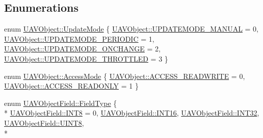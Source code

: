 \subsection*{Enumerations}
\begin{DoxyCompactItemize}
\item 
enum \hyperlink{group___u_a_v_objects_plugin_ga08c0580992fcd51c2b44734e2d24cac6}{U\-A\-V\-Object\-::\-Update\-Mode} \{ \hyperlink{group___u_a_v_objects_plugin_gga08c0580992fcd51c2b44734e2d24cac6a7e761571cc6ee4432fa664f23fcb7032}{U\-A\-V\-Object\-::\-U\-P\-D\-A\-T\-E\-M\-O\-D\-E\-\_\-\-M\-A\-N\-U\-A\-L} = 0, 
\hyperlink{group___u_a_v_objects_plugin_gga08c0580992fcd51c2b44734e2d24cac6a6057e8a8af67f00940fad6f62499b843}{U\-A\-V\-Object\-::\-U\-P\-D\-A\-T\-E\-M\-O\-D\-E\-\_\-\-P\-E\-R\-I\-O\-D\-I\-C} = 1, 
\hyperlink{group___u_a_v_objects_plugin_gga08c0580992fcd51c2b44734e2d24cac6a118268aa016a1f371149d6180bd9a366}{U\-A\-V\-Object\-::\-U\-P\-D\-A\-T\-E\-M\-O\-D\-E\-\_\-\-O\-N\-C\-H\-A\-N\-G\-E} = 2, 
\hyperlink{group___u_a_v_objects_plugin_gga08c0580992fcd51c2b44734e2d24cac6aea4380a186f544bd364259d2e436fb75}{U\-A\-V\-Object\-::\-U\-P\-D\-A\-T\-E\-M\-O\-D\-E\-\_\-\-T\-H\-R\-O\-T\-T\-L\-E\-D} = 3
 \}
\item 
enum \hyperlink{group___u_a_v_objects_plugin_ga80357a2f38fa4be23200de86614c3d77}{U\-A\-V\-Object\-::\-Access\-Mode} \{ \hyperlink{group___u_a_v_objects_plugin_gga80357a2f38fa4be23200de86614c3d77ad710c074e7e275da805bf900c9917d47}{U\-A\-V\-Object\-::\-A\-C\-C\-E\-S\-S\-\_\-\-R\-E\-A\-D\-W\-R\-I\-T\-E} = 0, 
\hyperlink{group___u_a_v_objects_plugin_gga80357a2f38fa4be23200de86614c3d77a97e59f527995175cc60e103001470e49}{U\-A\-V\-Object\-::\-A\-C\-C\-E\-S\-S\-\_\-\-R\-E\-A\-D\-O\-N\-L\-Y} = 1
 \}
\item 
enum \hyperlink{group___u_a_v_objects_plugin_ga74498368bc91f3ed74beacb096744cf3}{U\-A\-V\-Object\-Field\-::\-Field\-Type} \{ \\*
\hyperlink{group___u_a_v_objects_plugin_gga74498368bc91f3ed74beacb096744cf3a19e2840fa94a77e0e4d6bcf7fb40e734}{U\-A\-V\-Object\-Field\-::\-I\-N\-T8} = 0, 
\hyperlink{group___u_a_v_objects_plugin_gga74498368bc91f3ed74beacb096744cf3a449ba7536fca8720c9608dd26c74182a}{U\-A\-V\-Object\-Field\-::\-I\-N\-T16}, 
\hyperlink{group___u_a_v_objects_plugin_gga74498368bc91f3ed74beacb096744cf3ad47a62cf1ae89582cb875a6bc59662ec}{U\-A\-V\-Object\-Field\-::\-I\-N\-T32}, 
\hyperlink{group___u_a_v_objects_plugin_gga74498368bc91f3ed74beacb096744cf3a6546a8ed8b8449d2829291856d3f8e5d}{U\-A\-V\-Object\-Field\-::\-U\-I\-N\-T8}, 
\\*

\end{DoxyCompactItemize}

